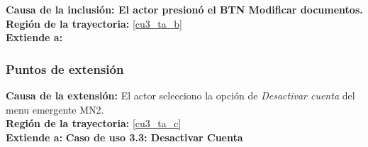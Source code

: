 \noindent \textbf{Causa de la inclusión: El actor presionó el BTN Modificar documentos.} \\
\textbf{Región de la trayectoria:} \ref{cu3_ta_b} \\
\textbf{Extiende a:} \textbf{}

\subsubsection{Puntos de extensión}
\noindent \textbf{Causa de la extensión:} El actor selecciono la opción de \textit{Desactivar cuenta} del menu emergente MN2. \\
\textbf{Región de la trayectoria:} \ref{cu3_ta_c} \\
\textbf{Extiende a:} \textbf{Caso de uso 3.3: Desactivar Cuenta}
